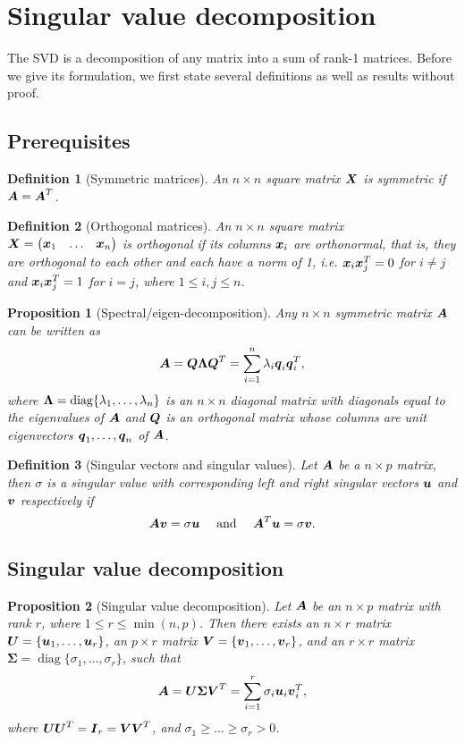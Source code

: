 \documentclass[12pt]{article}
\newtheorem{prop}{Proposition}[section]
\newtheorem{dfn}{Definition}[section]
\DeclareMathOperator{\diag}{diag}
\newcommand{\Sg}{\Sigma}
\begin{document}
	\pagebreak
	
	\appendix %
	\section{\label{sec:svd}Singular value decomposition}
	The SVD is a decomposition of any matrix into a sum of rank-1 matrices. Before we give its formulation, we first state several definitions as well as results without proof.
	\subsection{Prerequisites}
	\begin{dfn}[Symmetric matrices]
		An $n\times n$ square matrix $\boldsymbol{X}$ is symmetric if $\boldsymbol{A}=\boldsymbol{A}^T$.
	\end{dfn}
	\begin{dfn}[Orthogonal matrices]
		An $n\times n$ square matrix $\boldsymbol{X}=\begin{pmatrix}
			\boldsymbol{x}_1 & \ldots & \boldsymbol{x}_n
		\end{pmatrix}$ is orthogonal if its columns $\boldsymbol{x}_i$ are orthonormal, that is, they are orthogonal to each other and each have a norm of 1, i.e. $\boldsymbol{x}_i\boldsymbol{x}_j^T=0$ for $i\neq j$ and $\boldsymbol{x}_i\boldsymbol{x}_j^T=1$ for $i=j$, where $1\leq i,j\leq n$.
	\end{dfn}
	\begin{prop}[Spectral/eigen-decomposition]
		Any $n\times n$ symmetric matrix $\boldsymbol{A}$ can be written as 
		$$\boldsymbol{A}=\boldsymbol{Q}\boldsymbol{\Lambda}\boldsymbol{Q}^T=\sum_{i=1}^{n}\lambda_i\boldsymbol{q}_i\boldsymbol{q}_i^T,$$
		where $\boldsymbol{\Lambda}=\diag\{\lm_1,\ldots,\lm_n\}$ is an $n\times n$ diagonal matrix with diagonals equal to the eigenvalues of $\boldsymbol{A}$ and $\boldsymbol{Q}$ is an orthogonal matrix whose columns are unit eigenvectors $\boldsymbol{q}_1,\ldots,\boldsymbol{q}_n$ of $\boldsymbol{A}$.
	\end{prop}
	\begin{dfn}[Singular vectors and singular values]
		Let $\boldsymbol{A}$ be a $n\times p$ matrix, then $\sigma$ is a singular value with corresponding left and right singular vectors $\boldsymbol{u}$ and $\boldsymbol{v}$ respectively if
		$$\boldsymbol{A}\boldsymbol{v}=\sigma\boldsymbol{u} \quad \text{ and }\quad \boldsymbol{A}^T\boldsymbol{u}=\sigma\boldsymbol{v}.$$
	\end{dfn}
	
	\subsection{Singular value decomposition}
	\begin{prop}[Singular value decomposition]
		Let $\boldsymbol{A}$ be an $n\times p$ matrix with rank $r$, where $1\leq r\leq \min(n,p)$. Then there exists an $n\times r$ matrix $\boldsymbol{U}=\{\boldsymbol{u}_1,\ldots,\boldsymbol{u}_r\}$, an $p\times r$ matrix $\boldsymbol{V}=\{\boldsymbol{v}_1,\ldots,\boldsymbol{v}_r\}$, and an $r\times r$ matrix $\boldsymbol{\Sg}=\diag\{\sigma_1,\ldots,\sigma_r\}$, such that
		$$\bmA=\bmU\boldsymbol{\Sg}\bmV^T=\sum_{i=1}^{r}\sigma_i\bmu_i\bmv_i^T,$$
		where $\boldsymbol{U}\boldsymbol{U}^T=\boldsymbol{I}_r=\boldsymbol{V}\boldsymbol{V}^T$, and $\sigma_1\geq\ldots\geq\sigma_r>0$.
	\end{prop}
	
\end{document}
